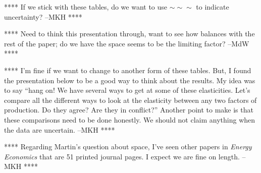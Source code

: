 \documentclass[preprint,authoryear,12pt]{elsarticle}\usepackage[]{graphicx}\usepackage[]{color}
\begin{document}
**** If we stick with these tables, do we want to use $\sim\sim\sim$ to indicate uncertainty? --MKH ****

**** Need to think this presentation through, 
want to see how balances with the rest of the paper; 
do we have the space seems to be the limiting factor? --MdW ****

**** I'm fine if we want to change to another form of these tables.
But, I found the presentation below to be a good way to think about the results.
My idea was to say ``hang on! We have several ways to get at some of these elasticities.
Let's compare all the different ways to look at the elasticity between any two factors of production.
Do they agree?  
Are they in conflict?''  
Another point to make is that these comparisons need to be done honestly. 
We should not claim anything when the data are uncertain. --MKH ****

**** Regarding Martin's question about space, 
I've seen other papers in \emph{Energy Economics} that are 51 printed journal pages. \citep{Saunders:2008aa}
I expect we are fine on length. --MKH ****

\end{document}
